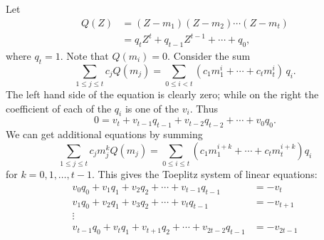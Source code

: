Let 
\[
\begin{aligned}
  Q(Z) & = (Z - m_1) (Z - m_2) \cdots (Z - m_t)\\
    & = q_t Z^t + q_{t-1} Z^{t-1} + \cdots + q_0,
\end{aligned}
\]
where $q_t = 1$.  Note that $Q(m_i) = 0$.  Consider the sum 
\[
\sum_{1 \le j \le t} c_j Q(m_j) =
  \sum _{0 \le i < t} \left(c_1 m_1^i + \cdots + c_t m_t^i\right)\,q_i.
\]
The left hand side of the equation is clearly zero; while on the right the
coefficient of each of the $q_i$ is one of the $v_i$.  Thus
\[
0 = v_t + v_{t-1} q_{t-1} + v_{t-2} q_{t-2} + \cdots + v_0 q_0.
\]
We can get additional equations by summing
\[
\sum_{1 \le j \le t} c_j m_j^k Q(m_j) 
 = \sum_{0 \le i \le t} (c_1 m_1^{i+k} + \cdots + c_t m_t^{i+k}) q_i
\]
for $k = 0, 1, \ldots, t-1$.  This gives the Toeplitz system of linear
equations:
\begin{equation} \label{Toeplitz:Eq}
\begin{aligned}
  v_0 q_0 + v_1 q_1 + v_2 q_2 + \cdots + v_{t-1} q_{t-1} &= - v_t\\
  v_1 q_0 + v_2 q_1 + v_3 q_2 +\cdots + v_{t} q_{t-1} &= - v_{t+1}\\
  \vdots\\
  v_{t-1}q_0 + v_{t} q_1 + v_{t+1} q_2 + \cdots + v_{2t-2} q_{t-1} &= -
    v_{2t-1}
\end{aligned}
\end{equation}

